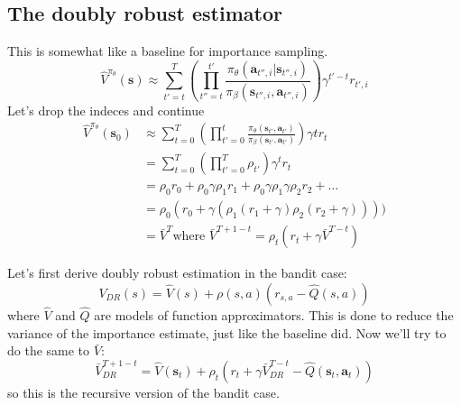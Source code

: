 \documentclass{report}
\begin{document}
\subsection{The doubly robust estimator}
This is somewhat like a baseline for importance sampling.
\begin{equation}
\hat{V}^{\pi_\theta}(\bm{s}) \approx
\sum_{t'=t}^{T} \left( \prod_{t''=t}^{t'}  \frac{\pi_{ \theta }(\bm{a}_{t'',i}| \bm{s}_{t'',i} )}{\pi_{ \beta }(\bm{s}_{t'',i}, \bm{a}_{t'',i} )} \right) 
\gamma^{ t'-t } r_{ t',i }
\end{equation}
Let's drop the indeces and continue
\begin{align}
\hat{V}^{\pi_\theta}(\bm{s}_{ 0 }) &\approx
\sum_{t=0}^{T}
\left(   
\prod_{t'=0}^{t} \frac{\pi_{ \theta  }(\bm{s}_{t'}, \bm{a}_{t'} )}{\pi_{ \beta }(\bm{s}_{t'}, \bm{a}_{t'} )}  
\right) \gamma{t}r_{ t }  \\
&= 
\sum_{t=0}^{T} \left( \prod_{t'=0}^{T} \rho_{ t' }  \right) \gamma^{ t } r_{ t } \\
&=
\rho_{ 0 }r_{ 0 } + \rho_{ 0 }\gamma \rho_{ 1 }r_{ 1 } + \rho_{ 0 }\gamma \rho_{ 1 }\gamma \rho_{ 2 }r_{ 2 } + \dots \\
&=
\rho_{ 0 } (r_{ 0 } + \gamma (\rho_{ 1 } (r_{ 1 } + \gamma )\rho_{ 2 } (r_{ 2 } + \gamma)))) \\
&=
\bar{V}^{ T } \text{where } \bar{V}^{ T+1-t } = \rho_{ t } (r_{ t } + \gamma \bar{V}^{ T-t })
\end{align}

Let's first derive doubly robust estimation in the bandit case:
\begin{equation}
		V_{ DR } (s) = \hat{V} (s) + \rho (s,a) (r_{ s,a } - \hat{Q} (s,a))
\end{equation}
where $ \hat{V}  $ and $ \hat{Q}  $ are models of function approximators.
This is done to reduce the variance of the importance estimate,
just like the baseline did.
Now we'll try to do the same to $ \bar{V}  $:
\begin{equation}
		\bar{V}^{ T+1-t }_{ DR } = \hat{V} (\bm{s}_{t}) + \rho_{ t } (r_{ t } + \gamma \bar{V}_{ DR }^{ T-t } - \hat{Q}(\bm{s}_{t}, \bm{a}_{t} ))
\end{equation}
so this is the recursive version of the bandit case.
\end{document}

